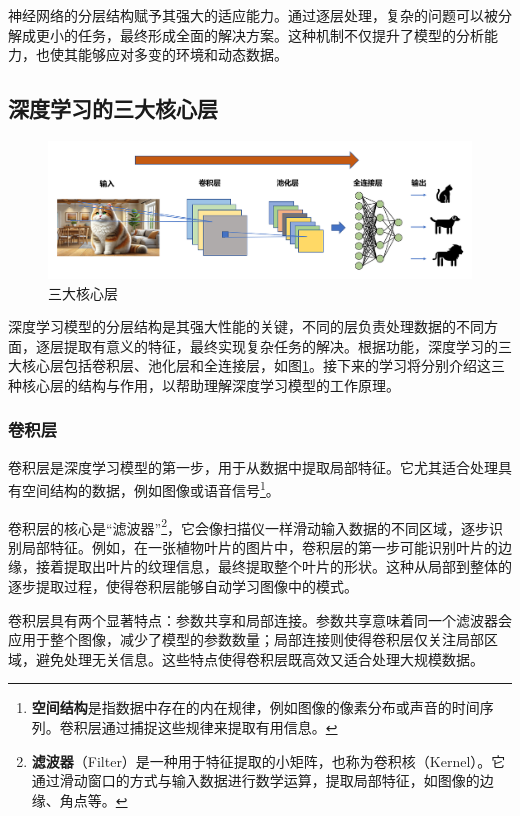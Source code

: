 神经网络的分层结构赋予其强大的适应能力。通过逐层处理，复杂的问题可以被分解成更小的任务，最终形成全面的解决方案。这种机制不仅提升了模型的分析能力，也使其能够应对多变的环境和动态数据。

\subsection{深度学习的三大核心层}

\begin{figure}[H]
    \centering
    \includegraphics[width=\linewidth]{image/2/3大层.png}
    \caption{三大核心层}
    \label{fig:三大核心层}
\end{figure}

深度学习模型的分层结构是其强大性能的关键，不同的层负责处理数据的不同方面，逐层提取有意义的特征，最终实现复杂任务的解决。根据功能，深度学习的三大核心层包括卷积层、池化层和全连接层，如图\ref{fig:三大核心层}。接下来的学习将分别介绍这三种核心层的结构与作用，以帮助理解深度学习模型的工作原理。

\subsubsection{卷积层}

卷积层是深度学习模型的第一步，用于从数据中提取局部特征。它尤其适合处理具有空间结构的数据，例如图像或语音信号\footnote{\textbf{空间结构}是指数据中存在的内在规律，例如图像的像素分布或声音的时间序列。卷积层通过捕捉这些规律来提取有用信息。}。

卷积层的核心是“滤波器”\footnote{\textbf{滤波器}（Filter）是一种用于特征提取的小矩阵，也称为卷积核（Kernel）。它通过滑动窗口的方式与输入数据进行数学运算，提取局部特征，如图像的边缘、角点等。}，它会像扫描仪一样滑动输入数据的不同区域，逐步识别局部特征。例如，在一张植物叶片的图片中，卷积层的第一步可能识别叶片的边缘，接着提取出叶片的纹理信息，最终提取整个叶片的形状。这种从局部到整体的逐步提取过程，使得卷积层能够自动学习图像中的模式。

卷积层具有两个显著特点：参数共享和局部连接。参数共享意味着同一个滤波器会应用于整个图像，减少了模型的参数数量；局部连接则使得卷积层仅关注局部区域，避免处理无关信息。这些特点使得卷积层既高效又适合处理大规模数据。

